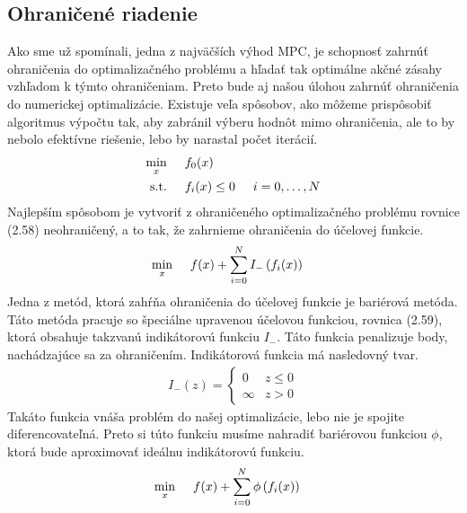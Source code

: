 \subsection{Ohraničené riadenie}
\label{subse:Ohranicenia}
Ako sme už spomínali, jedna z najväčších výhod MPC, je schopnosť zahrnúť ohraničenia do optimalizačného problému a hľadať tak optimálne akčné zásahy vzhľadom k týmto ohraničeniam. Preto bude aj našou úlohou zahrnúť ohraničenia do numerickej optimalizácie. Existuje veľa spôsobov, ako môžeme prispôsobiť algoritmus výpočtu tak, aby zabránil výberu hodnôt mimo ohraničenia, ale to by nebolo efektívne riešenie, lebo by narastal počet iterácií. 
\begin{subequations}
	\begin{align}
	\displaystyle \min_{x} \hspace{0.5cm} & 
	f_{0}(x)\\
	\textrm{s.t.} \hspace{0.5cm} & f_{i}(x) \leq 0 \hspace{0.5cm} i=0,\dots,N
	\end{align}
\end{subequations}
Najlepším spôsobom je vytvoriť z ohraničeného optimalizačného problému rovnice (2.58) neohraničený, a to tak, že zahrnieme ohraničenia do účelovej funkcie. 
\begin{align}
\displaystyle \min_{x} \hspace{0.5cm} & 
f(x) + \sum_{i=0}^{N}I_{-}\left(f_{i}(x)\right)
\end{align}
Jedna z metód, ktorá zahŕňa ohraničenia do účelovej funkcie je bariérová metóda. Táto metóda pracuje so špeciálne upravenou účelovou funkciou, rovnica (2.59), ktorá obsahuje takzvanú indikátorovú funkciu $I_{-}$. Táto funkcia penalizuje body, nachádzajúce sa za ohraničením. Indikátorová funkcia má nasledovný tvar.
\begin{align}
	I_{-}(z) =
	\begin{cases}
		0 & z \leq 0\\
		\infty & z > 0
	\end{cases}
\end{align}
Takáto funkcia vnáša problém do našej optimalizácie, lebo nie je spojite diferencovateľná. Preto si túto funkciu musíme nahradiť bariérovou funkciou $\phi$, ktorá bude aproximovať ideálnu indikátorovú funkciu. 
\begin{align}
\displaystyle \min_{x} \hspace{0.5cm} & 
f(x) + \sum_{i=0}^{N}\phi\left(f_{i}(x)\right)
\end{align}
